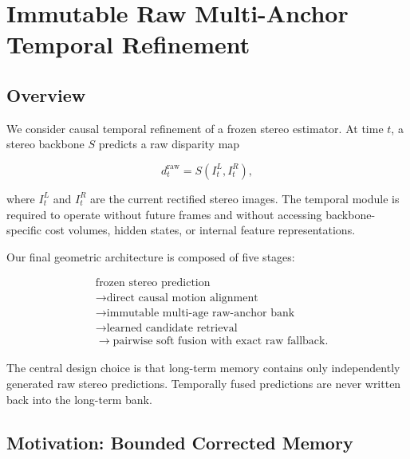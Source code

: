 \documentclass[11pt,a4paper]{article}
\begin{document}

\section{Immutable Raw Multi-Anchor Temporal Refinement}
\label{sec:method}

\subsection{Overview}

We consider causal temporal refinement of a frozen stereo estimator.
At time \(t\), a stereo backbone \(S\) predicts a raw disparity map

\begin{equation}
d_t^{\mathrm{raw}}
=
S\left(I_t^L,I_t^R\right),
\end{equation}

where \(I_t^L\) and \(I_t^R\) are the current rectified stereo images.
The temporal module is required to operate without future frames and
without accessing backbone-specific cost volumes, hidden states, or
internal feature representations.

Our final geometric architecture is composed of five stages:

\begin{equation}
\boxed{
\begin{aligned}
&\text{frozen stereo prediction}
\\[-1mm]
&\rightarrow
\text{direct causal motion alignment}
\\[-1mm]
&\rightarrow
\text{immutable multi-age raw-anchor bank}
\\[-1mm]
&\rightarrow
\text{learned candidate retrieval}
\\[-1mm]
&\rightarrow
\text{pairwise soft fusion with exact raw fallback}.
\end{aligned}
}
\end{equation}

The central design choice is that long-term memory contains only
independently generated raw stereo predictions.
Temporally fused predictions are never written back into the long-term
bank.

\subsection{Motivation: Bounded Corrected Memory}
\label{sec:bounded_memory}
\end{document}
